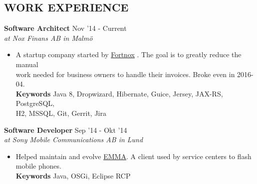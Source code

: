\documentclass[overlapped]{res}
\begin{document}
 
\begin{resume}
\vspace{1.2cm}
\section{{\sc WORK EXPERIENCE}} 

{\bf Software Architect} \hfill Nov '14 - Current \\
{\sl at Nox Finans AB in Malmö}
\begin{itemize}
\itemsep -1pt
\item A startup company started by \href{http://www.fortnox.se/}{Fortnox} . The goal is to greatly reduce the manual 
\\work needed for business owners to handle their invoices. Broke even in 2016-04.
\\{\bf Keywords} Java 8, Dropwizard, Hibernate, Guice, Jersey, JAX-RS, PostgreSQL,
\\H2, MSSQL, Git, Gerrit, Jira
\end{itemize}

{\bf Software Developer} \hfill Sep '14 - Okt '14 \\
{\sl at Sony Mobile Communications AB in Lund}
\begin{itemize}
\itemsep -1pt
\item Helped maintain and evolve \href{http://emma.extranet.sonyericsson.com/emma/}{EMMA}. A client used by service centers to flash 
\\mobile phones.
\\{\bf Keywords} Java, OSGi, Eclipse RCP 
\end{itemize}


\end{resume}
\end{document}
